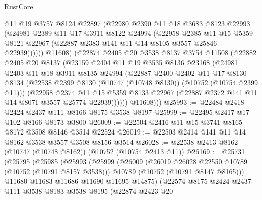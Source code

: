 \begin{lexlean}{RustCore}
\begin{coremodule}
              @11
              @19
              @3757
              @8124
              @22897
              (@22980
                @2390
                @11
                @18
                @3683
                @8123
                @22993
                (@24981
                  @2389
                  @11
                  @17
                  @3911
                  @8122
                  @24994
                  (@22958
                    @2385
                    @11
                    @15
                    @5359
                    @8121
                    @22967
                    (@22887 @2383 @141 @11 @14 @8105 @3557 @25846 @22939))))))
          @11608)
        (@22874
          @2405
          @20
          @3538
          @8137
          @3754
          @11508
          (@22882
            @2405
            @20
            @8137
            (@23159
              @2404
              @11
              @19
              @3535
              @8136
              @23168
              (@24981
                @2403
                @11
                @18
                @3911
                @8135
                @24994
                (@22887
                  @2400
                  @2402
                  @11
                  @17
                  @8130
                  @8134
                  (@22538 @2399 @8130 (@10747 (@10748 @8130)) (@10752 (@10754 @2399 @11)))
                  (@22958
                    @2374
                    @11
                    @15
                    @5359
                    @8133
                    @22967
                    (@22887 @2372 @141 @11 @14 @8071 @3557 @25774 @22939))))))
          @11608)))
@25993 := @22484 @2418 @2424 @2437 @111 @8166 @8175 @3538 @8197
@25999 := @22495 @2417 @17 @102 @8166 @8173 @3800
@26009 := @22504 @2416 @11 @15 @3741 @8165 @8172 @3508 @8146 @3514 @22524
@26019 := @22503 @2414 @141 @11 @14 @8162 @3538 @3557 @3508 @8156 @3514
@26028 := @22538 @2413 @8162 (@10747 (@10748 @8162)) (@10752 (@10754 @2413 @11))
@26169 := @25731
    (@25795
      (@25985
        (@25993
          (@25999
            (@26009
              (@26019 @26028 @22550 @10789 (@10752 (@10791 @8157 @3538)))
              @10789
              (@10752 (@10791 @8147 @8165)))
            @11680
            @11683
            @11686
            @11690
            @11695
            @14875)
          (@22574
            @8175
            @2424
            @2437
            @111
            @3538
            @8183
            @3538
            @8195
            (@22874
              @2423
              @20

\end{coremodule}
\end{lexlean}

